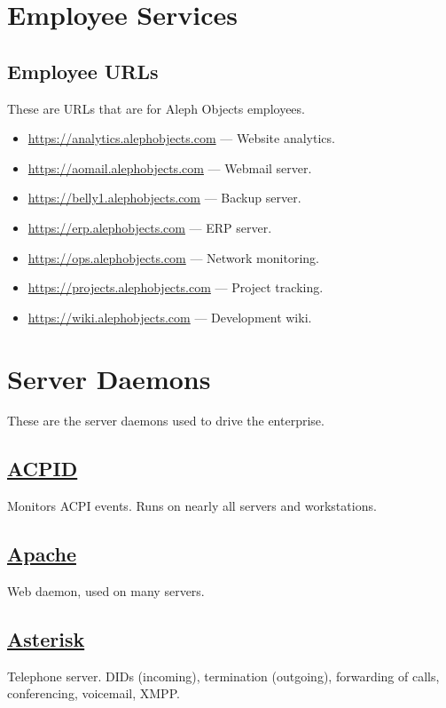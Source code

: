 \section{Employee Services}
\subsection{Employee URLs}
These are URLs that are for Aleph Objects employees.

\begin{itemize}
\item \url{https://analytics.alephobjects.com} --- Website analytics.
\item \url{https://aomail.alephobjects.com} --- Webmail server.
\item \url{https://belly1.alephobjects.com} --- Backup server.
\item \url{https://erp.alephobjects.com} --- ERP server.
\item \url{https://ops.alephobjects.com} --- Network monitoring.
\item \url{https://projects.alephobjects.com} --- Project tracking.
\item \url{https://wiki.alephobjects.com} --- Development wiki.
\end{itemize}

\section{Server Daemons}
These are the server daemons used to drive the enterprise.

\subsection{\href{http://sourceforge.net/projects/acpid2/}{ACPID}}
Monitors ACPI events. Runs on nearly all servers and workstations.

\subsection{\href{http://httpd.apache.org/}{Apache}}
Web daemon, used on many servers.

\subsection{\href{http://www.asterisk.org}{Asterisk}}
Telephone server. DIDs (incoming), termination (outgoing), forwarding of calls, conferencing,
voicemail, XMPP.

